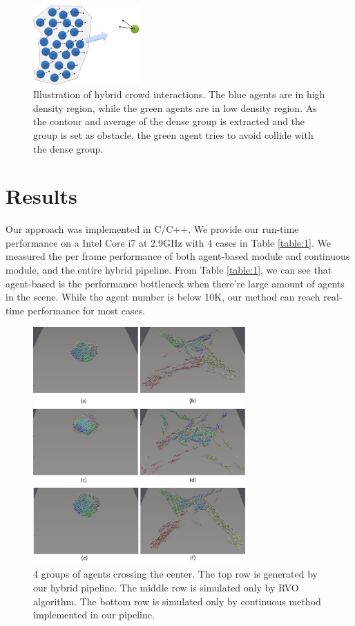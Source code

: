 \documentclass{egpubl}
\begin{document}
\begin{figure}

\centering
  \includegraphics[width=1.6in]{images/agent_group_collision}
  \caption{Illustration of hybrid crowd interactions. The blue agents are in high density region, while the green agents are in low density region. As the contour and average of the dense group is extracted and the group is set as obstacle, the green agent tries to avoid collide with the dense group.}
  \label{fig:agent_group_interaction}
\end{figure}

\section{Results}
\label{section:5}
Our approach was implemented in C/C++. We provide our run-time performance on a Intel Core i7 at 2.9GHz with 4 cases in Table \ref{table:1}. We measured the per frame performance of both agent-based module and continuous module, and the entire hybrid pipeline. From Table \ref{table:1}, we can see that agent-based is the performance bottleneck when there're large amount of agents in the scene. While the agent number is below 10K, our method can reach real-time performance for most cases.

\begin{figure}
  \centering
  \includegraphics[width=3.2in]{images/four_corner}
  \caption{4 groups of agents crossing the center. The top row is generated by our hybrid pipeline. The middle row is simulated only by RVO algorithm. The bottom row is simulated only by continuous method implemented in our pipeline.}
  \label{fig:four_corner}
\end{figure}
\end{document}
